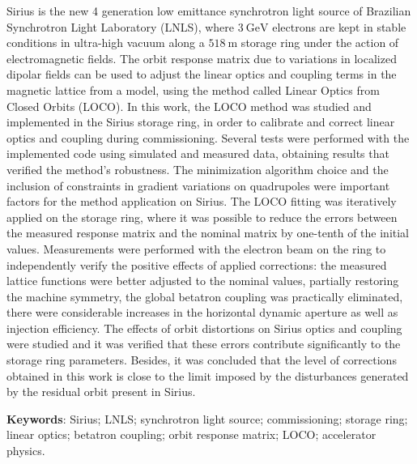 \begin{resumo}
\renewcommand{\sfdefault}{\rmdefault}
    Sirius is the new 4 generation low emittance synchrotron light source of Brazilian Synchrotron Light Laboratory (LNLS), where $\SI{3}{\giga\electronvolt}$ electrons are kept in stable conditions in ultra-high vacuum along a $\SI{518}{\meter}$ storage ring under the action of electromagnetic fields. The orbit response matrix due to variations in localized dipolar fields can be used to adjust the linear optics and coupling terms in the magnetic lattice from a model, using the method called Linear Optics from Closed Orbits (LOCO). In this work, the LOCO method was studied and implemented in the Sirius storage ring, in order to calibrate and correct linear optics and coupling during commissioning. Several tests were performed with the implemented code using simulated and measured data, obtaining results that verified the method's robustness. The minimization algorithm choice and the inclusion of constraints in gradient variations on quadrupoles were important factors for the method application on Sirius. The LOCO fitting was iteratively applied on the storage ring, where it was possible to reduce the errors between the measured response matrix and the nominal matrix by one-tenth of the initial values. Measurements were performed with the electron beam on the ring to independently verify the positive effects of applied corrections: the measured lattice functions were better adjusted to the nominal values, partially restoring the machine symmetry, the global betatron coupling was practically eliminated, there were considerable increases in the horizontal dynamic aperture as well as injection efficiency. The effects of orbit distortions on Sirius optics and coupling were studied and it was verified that these errors contribute significantly to the storage ring parameters. Besides, it was concluded that the level of corrections obtained in this work is close to the limit imposed by the disturbances generated by the residual orbit present in Sirius.
    
    \vspace{\onelineskip}
    \noindent\textbf{Keywords}: Sirius; LNLS; synchrotron light source; commissioning; storage ring; linear optics; betatron coupling; orbit response matrix; LOCO; accelerator physics.
    \vspace{\fill}
\end{resumo}

\renewcommand{\sfdefault}{\rmdefault}
\listoffigures*
\cleardoublepage


\renewcommand{\sfdefault}{\rmdefault}
\listoftables*
\cleardoublepage

\renewcommand{\sfdefault}{\rmdefault}
\printglossaries
\cleardoublepage


\renewcommand{\sfdefault}{\rmdefault}
\tableofcontents*
\cleardoublepage

